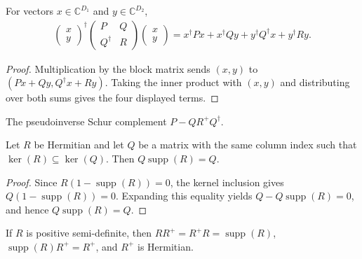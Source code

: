 \begin{theorem}
  \label{thm:block_quadratic_form}
  \leanok
  For vectors $x\in\mathbb C^{D_1}$ and $y\in\mathbb C^{D_2}$,
  \begin{align}
    \begin{pmatrix}x\\y\end{pmatrix}^{\!\dagger}
      \begin{pmatrix}P&Q\\Q^\dagger&R\end{pmatrix}
      \begin{pmatrix}x\\y\end{pmatrix}
    =x^\dagger P x+x^\dagger Qy+y^\dagger Q^\dagger x+y^\dagger Ry.
  \end{align}
\end{theorem}

\begin{proof}\leanok
  Multiplication by the block matrix sends $(x,y)$ to
  $(Px+Qy,Q^\dagger x+Ry)$. Taking the inner product with $(x,y)$ and
  distributing over both sums gives the four displayed terms.
\end{proof}

\begin{definition}\label{def:schurComplement}
  \leanok
  The pseudoinverse Schur complement $P - Q R^+ Q^\dagger$.
\end{definition}

\begin{theorem}
  \label{thm:support_absorption_of_kernel_inclusion}
  \leanok
  Let $R$ be Hermitian and let $Q$ be a matrix with the same column index
  such that $\ker(R)\subseteq\ker(Q)$. Then
  $Q\operatorname{supp}(R)=Q$.
\end{theorem}

\begin{proof}\leanok
  Since $R(1-\operatorname{supp}(R))=0$, the kernel inclusion gives
  $Q(1-\operatorname{supp}(R))=0$. Expanding this equality yields
  $Q-Q\operatorname{supp}(R)=0$, and hence
  $Q\operatorname{supp}(R)=Q$.
\end{proof}

\begin{theorem}
  \label{thm:schur_pinv_support_identities}
  \leanok
  If $R$ is positive semi-definite, then
  $RR^+=R^+R=\operatorname{supp}(R)$,
  $\operatorname{supp}(R)R^+=R^+$, and $R^+$ is Hermitian.
\end{theorem}

